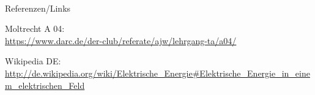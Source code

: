 \renewcommand{\refname}{Referenzen}

\hypertarget{refs}{}
\textcolor{white}{} \\ %
\Large Referenzen/Links
\footnotesize

\begin{thebibliography}{}
     Moltrecht A 04: \\
    \url{https://www.darc.de/der-club/referate/ajw/lehrgang-ta/a04/}

      Wikipedia DE: \\
    \url{http://de.wikipedia.org/wiki/Elektrische_Energie#Elektrische_Energie_in_einem_elektrischen_Feld}

\end{thebibliography}


